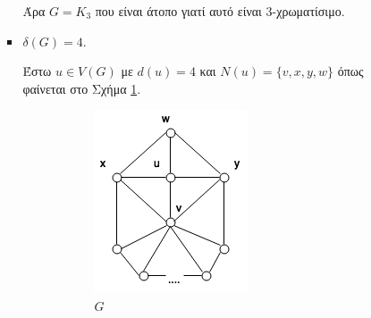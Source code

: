 \documentclass[a4paper, oneside, 11pt]{article}
\theoremstyle{definition}
\begin{document}
\begin{enumerate}
\begin{itemize}
\begin{itemize}
            Άρα $G = K_3$ που είναι άτοπο γιατί αυτό είναι 3-χρωματίσιμο.

            \item $\delta(G) = 4$.

            Έστω $u \in V(G)$ με $d(u) = 4$ και $N(u) = \{ v, x, y, w \}$
            όπως φαίνεται στο Σχήμα \ref{fig2.11.1}.

            \begin{figure}
               \centering
               \begin{subfigure}[b]{0.3\textwidth}
                  \includegraphics[width=\textwidth]{./pics/fig1.png}
                  \caption{$G$}
                  \label{fig2.11.1}
               \end{subfigure}
               ~
               \begin{subfigure}[b]{0.3\textwidth}

\end{subfigure}
\end{figure}
\end{itemize}
\end{itemize}
\end{enumerate}
\end{document}

